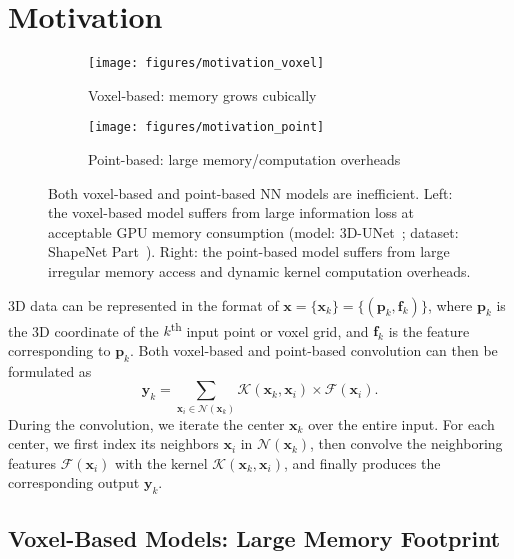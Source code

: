\documentclass{article}
\begin{document}
 \section{Motivation}
\label{sec:motivation}

\begin{figure}[t]
\centering
\begin{subfigure}{0.485\textwidth}
    \centering
    \texttt{[image: figures/motivation\_voxel]}
    \caption{Voxel-based: memory grows cubically}
    \label{fig:motivation:a}
\end{subfigure}
\hfill
\begin{subfigure}{0.49\textwidth}
    \centering
    \texttt{[image: figures/motivation\_point]}
    \caption{Point-based: large memory/computation overheads}
    \label{fig:motivation:b}
\end{subfigure}
\caption{Both voxel-based and point-based NN models are inefficient. Left: the voxel-based model suffers from large information loss at acceptable GPU memory consumption (model: 3D-UNet~\cite{Cicek:2016un}; dataset: ShapeNet Part~\cite{Chang:2015sn}). Right: the point-based model suffers from large irregular memory access and dynamic kernel computation overheads.}
\vspace{-10pt}
\label{fig:motivation}
\end{figure}
 
3D data can be represented in the format of $\bm{x} = \{\bm{x}_k\} = \{(\bm{p}_k, \bm{f}_k)\}$, where $\bm{p}_k$ is the 3D coordinate of the $k$\textsuperscript{th} input point or voxel grid, and $\bm{f}_k$ is the feature corresponding to $\bm{p}_k$. Both voxel-based and point-based convolution can then be formulated as
\begin{equation}
\label{eqn:conv}
    \bm{y}_k = \sum_{\bm{x}_i \in \mathcal{N}(\bm{x}_k)} \mathcal{K}(\bm{x}_k, \bm{x}_i) \times \mathcal{F}(\bm{x}_i).
\end{equation}
During the convolution, we iterate the center $\bm{x}_k$ over the entire input. For each center, we first index its neighbors $\bm{x}_i$ in $\mathcal{N}(\bm{x}_k)$, then convolve the neighboring features $\mathcal{F}(\bm{x}_i)$ with the kernel $\mathcal{K}(\bm{x}_k, \bm{x}_i)$, and finally produces the corresponding output $\bm{y}_k$.



\subsection{Voxel-Based Models: Large Memory Footprint}
\end{document}
